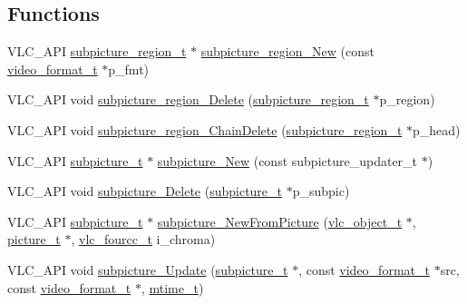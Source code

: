 \subsection*{Functions}
\begin{DoxyCompactItemize}
\item 
V\+L\+C\+\_\+\+A\+PI \hyperlink{structsubpicture__region__t}{subpicture\+\_\+region\+\_\+t} $\ast$ \hyperlink{group__subpicture_ga3cf9611325cfd60f346be7f6d2075cf3}{subpicture\+\_\+region\+\_\+\+New} (const \hyperlink{structvideo__format__t}{video\+\_\+format\+\_\+t} $\ast$p\+\_\+fmt)
\item 
V\+L\+C\+\_\+\+A\+PI void \hyperlink{group__subpicture_gacac77af39686761bc175d12b769c3dfb}{subpicture\+\_\+region\+\_\+\+Delete} (\hyperlink{structsubpicture__region__t}{subpicture\+\_\+region\+\_\+t} $\ast$p\+\_\+region)
\item 
V\+L\+C\+\_\+\+A\+PI void \hyperlink{group__subpicture_gac38fccf7b141ea5d16d875d05412dace}{subpicture\+\_\+region\+\_\+\+Chain\+Delete} (\hyperlink{structsubpicture__region__t}{subpicture\+\_\+region\+\_\+t} $\ast$p\+\_\+head)
\item 
V\+L\+C\+\_\+\+A\+PI \hyperlink{structsubpicture__t}{subpicture\+\_\+t} $\ast$ \hyperlink{group__subpicture_gaf44acd238f14210dad9199f48080f762}{subpicture\+\_\+\+New} (const subpicture\+\_\+updater\+\_\+t $\ast$)
\item 
V\+L\+C\+\_\+\+A\+PI void \hyperlink{group__subpicture_ga86b24b8b7a37505a97ce99e34b8fa83e}{subpicture\+\_\+\+Delete} (\hyperlink{structsubpicture__t}{subpicture\+\_\+t} $\ast$p\+\_\+subpic)
\item 
V\+L\+C\+\_\+\+A\+PI \hyperlink{structsubpicture__t}{subpicture\+\_\+t} $\ast$ \hyperlink{group__subpicture_gabbb6ca1aaee0248a446430c0c734c1ab}{subpicture\+\_\+\+New\+From\+Picture} (\hyperlink{structvlc__object__t}{vlc\+\_\+object\+\_\+t} $\ast$, \hyperlink{structpicture__t}{picture\+\_\+t} $\ast$, \hyperlink{vlc__common_8h_af49f89d0f752bc9cff142e43b1bd634d}{vlc\+\_\+fourcc\+\_\+t} i\+\_\+chroma)
\item 
V\+L\+C\+\_\+\+A\+PI void \hyperlink{group__subpicture_gaece760ee2ccc467fc2eb91fda3163d9b}{subpicture\+\_\+\+Update} (\hyperlink{structsubpicture__t}{subpicture\+\_\+t} $\ast$, const \hyperlink{structvideo__format__t}{video\+\_\+format\+\_\+t} $\ast$src, const \hyperlink{structvideo__format__t}{video\+\_\+format\+\_\+t} $\ast$, \hyperlink{vlc__common_8h_a996e47c5ea061215703c26738351279e}{mtime\+\_\+t})
\end{DoxyCompactItemize}


